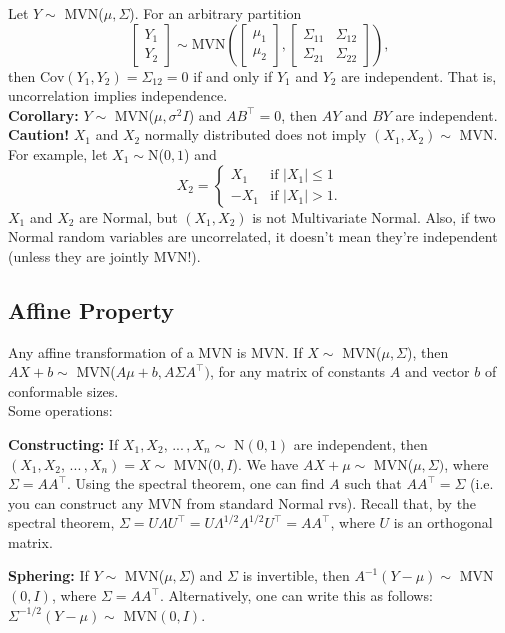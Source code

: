 \documentclass[letterpaper,11pt]{article}
\newenvironment{packed_item}{
\begin{itemize}
  \setlength{\itemsep}{1pt}
  \setlength{\parskip}{0pt}
  \setlength{\parsep}{0pt}
}{\end{itemize}}
\newcommand{\1}{\mathbf{1}} %
\begin{document}
Let $Y \sim$ MVN($\mu, \Sigma$). For an arbitrary partition
$$
\left[ \begin{array}{c} Y_1 \\ Y_2 \end{array} \right] \sim \text{MVN} \left( \left[ \begin{array}{c} \mu_1 \\ \mu_2 \end{array} \right] , \left[ \begin{array}{cc} \Sigma_{11} & \Sigma_{12} \\ \Sigma_{21} & \Sigma_{22} \end{array} \right] \right),
$$ 
then $\mathrm{Cov}(Y_1, Y_2) = \Sigma_{12} = 0$ if and only if $Y_1$ and $Y_2$ are independent. That is, uncorrelation implies independence. \\

\textbf{Corollary:} $Y \sim$ MVN($\mu, \sigma^2 I$) and $AB^\intercal = 0$, then $AY$ and $BY$ are independent. \\

\textbf{Caution!} $X_1$ and $X_2$ normally distributed does not imply $(X_1, X_2) \sim$ MVN. For example, let $X_1 \sim$N($0,1$) and 
$$
X_2 = \begin{cases} X_1 & \text{if } |X_1| \le 1 \\ - X_1 & \text{if } |X_1| > 1. \end{cases}
$$
$X_1$ and $X_2$ are Normal, but $(X_1, X_2)$ is not Multivariate Normal. Also, if two Normal random variables are uncorrelated, it doesn't mean they're independent (unless they are jointly MVN!).

\subsection{Affine Property}

Any affine transformation of a MVN is MVN. If $X \sim$ MVN($\mu, \Sigma$), then $AX + b \sim$ MVN($A\mu +b , A \Sigma A^\intercal)$, for any matrix of constants $A$ and vector $b$ of conformable sizes. \\

Some operations:
\begin{packed_item}
\item \textbf{Constructing:} If $X_1, X_2, \, ... \, , X_n \sim$
  N$(0,1)$ are independent, then $(X_1, X_2, \, ... \, , X_n) = X
  \sim$ MVN($0, I$). We have $AX + \mu \sim $ MVN($\mu, \Sigma)$,
  where $\Sigma = AA^\intercal$. Using the spectral theorem, one can
  find $A$ such that $AA^\intercal = \Sigma$ (i.e. you can construct
  any MVN from standard Normal rvs). Recall that, by the spectral theorem,  $\Sigma = U \Lambda U^\intercal = U \Lambda^{1/2} \Lambda^{1/2}U^{\intercal} = AA^\intercal$, where $U$ is an orthogonal matrix.
\item \textbf{Sphering:} If $Y \sim$ MVN($\mu, \Sigma$) and $\Sigma$ is invertible, then $A^{-1}(Y-\mu) \sim $ MVN$(0,I)$, where $\Sigma = AA^\intercal$. Alternatively, one can write this as follows: $\Sigma^{-1/2} (Y - \mu) \sim$ MVN$(0,I)$. 
\end{packed_item}
\end{document}
